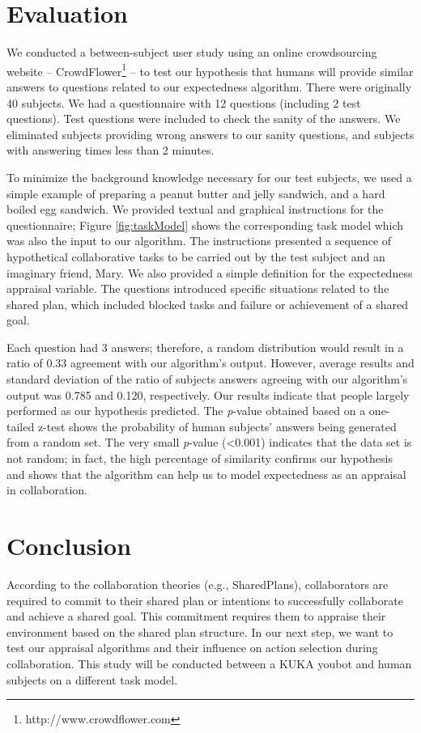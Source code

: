 \documentclass{aamas2016_extendedabstract}
\begin{document}
\vspace*{-6mm}
\section{Evaluation}

We conducted a between-subject user study using an online crowdsourcing website
-- CrowdFlower\footnote{http://www.crowdflower.com} -- to test our hypothesis
that humans will provide similar answers to questions related to our expectedness
algorithm. There were originally 40 subjects. We had a questionnaire with 12
questions (including 2 test questions). Test questions were included to check
the sanity of the answers. We eliminated subjects providing wrong answers to our
sanity questions, and subjects with answering times less than 2 minutes.

To minimize the background knowledge necessary for our test subjects, we used a
simple example of preparing a peanut butter and jelly sandwich, and a hard
boiled egg sandwich. We provided textual and graphical instructions for the
questionnaire; Figure \ref{fig:taskModel} shows the corresponding task
model which was also the input to our algorithm. The instructions presented a
sequence of hypothetical collaborative tasks to be carried out by the test
subject and an imaginary friend, Mary. We also provided a simple definition for
the expectedness appraisal variable. The questions introduced specific
situations related to the shared plan, which included blocked tasks and failure
or achievement of a shared goal. 

Each question had 3 answers; therefore, a random distribution would result in a
ratio of 0.33 agreement with our algorithm's output. However, average results
and standard deviation of the ratio of subjects answers agreeing with our
algorithm's output was 0.785 and 0.120, respectively. Our results indicate that
people largely performed as our hypothesis predicted. The \textit{p}-value
obtained based on a one-tailed z-test shows the probability of human subjects'
answers being generated from a random set. The very small \textit{p}-value
(<0.001) indicates that the data set is not random; in fact, the high percentage
of similarity confirms our hypothesis and shows that the algorithm can help us
to model expectedness as an appraisal in collaboration.

\vspace{-3mm}
\section{Conclusion}
According to the collaboration theories (e.g., SharedPlans), collaborators are
required to commit to their shared plan or intentions to successfully
collaborate and achieve a shared goal. This commitment requires them to appraise
their environment based on the shared plan structure. In our next step, we want
to test our appraisal algorithms and their influence on action selection during
collaboration. This study will be conducted between a KUKA youbot and human
subjects on a different task model.

\vspace{-3mm}


\end{document}
